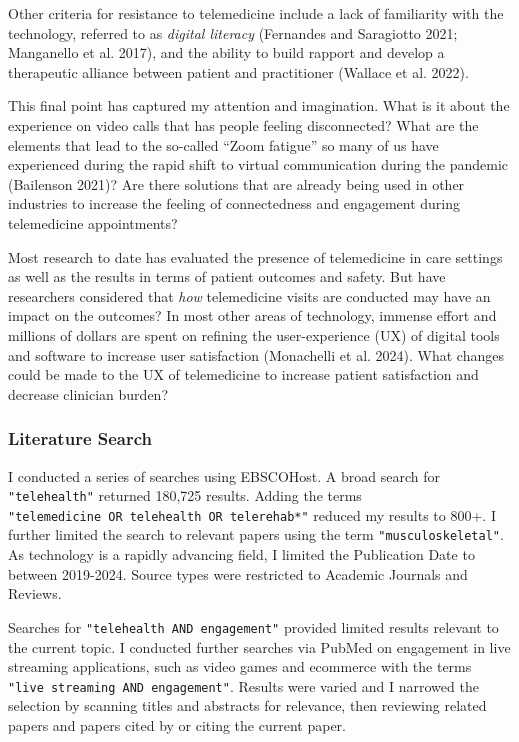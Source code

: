 \documentclass[
  letterpaper,
]{article}
\begin{document}
Other criteria for resistance to telemedicine include a lack of
familiarity with the technology, referred to as \emph{digital literacy}
(Fernandes and Saragiotto 2021; Manganello et al. 2017), and the ability
to build rapport and develop a therapeutic alliance between patient and
practitioner (Wallace et al. 2022).

This final point has captured my attention and imagination. What is it
about the experience on video calls that has people feeling
disconnected? What are the elements that lead to the so-called ``Zoom
fatigue'' so many of us have experienced during the rapid shift to
virtual communication during the pandemic (Bailenson 2021)? Are there
solutions that are already being used in other industries to increase
the feeling of connectedness and engagement during telemedicine
appointments?

Most research to date has evaluated the presence of telemedicine in care
settings as well as the results in terms of patient outcomes and safety.
But have researchers considered that \emph{how} telemedicine visits are
conducted may have an impact on the outcomes? In most other areas of
technology, immense effort and millions of dollars are spent on refining
the user-experience (UX) of digital tools and software to increase user
satisfaction (Monachelli et al. 2024). What changes could be made to the
UX of telemedicine to increase patient satisfaction and decrease
clinician burden?

\subsubsection{Literature Search}\label{literature-search}

I conducted a series of searches using EBSCOHost. A broad search for
\texttt{"telehealth"} returned 180,725 results. Adding the terms
\texttt{"telemedicine\ OR\ telehealth\ OR\ telerehab*"} reduced my
results to 800+. I further limited the search to relevant papers using
the term \texttt{"musculoskeletal"}. As technology is a rapidly
advancing field, I limited the Publication Date to between 2019-2024.
Source types were restricted to Academic Journals and Reviews.

Searches for \texttt{"telehealth\ AND\ engagement"} provided limited
results relevant to the current topic. I conducted further searches via
PubMed on engagement in live streaming applications, such as video games
and ecommerce with the terms
\texttt{"live\ streaming\ AND\ engagement"}. Results were varied and I
narrowed the selection by scanning titles and abstracts for relevance,
then reviewing related papers and papers cited by or citing the current
paper.
\end{document}
